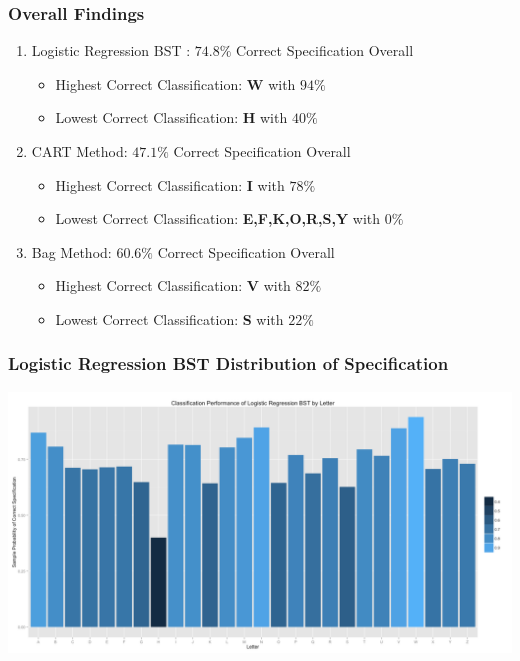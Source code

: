 \documentclass{beamer}
\begin{document}
\begin{frame}
\frametitle{Overall Findings}
\begin{enumerate}
\item Logistic Regression BST : $74.8\%$ Correct Specification Overall
\begin{itemize}
\item Highest Correct Classification: \textbf{W} with $94\%$
\item Lowest Correct Classification: \textbf{H} with $40\%$
\end{itemize}
\item CART Method: $47.1\%$ Correct Specification Overall
\begin{itemize}
\item Highest Correct Classification: \textbf{I} with $78\%$
\item Lowest Correct Classification: \textbf{E,F,K,O,R,S,Y} with $0\%$
\end{itemize}
\item Bag Method: $60.6\%$ Correct Specification Overall
\begin{itemize}
\item Highest Correct Classification: \textbf{V} with $82\%$
\item Lowest Correct Classification: \textbf{S} with $22\%$
\end{itemize}
\end{enumerate}
\end{frame}

\begin{frame}
\frametitle{Logistic Regression BST Distribution of Specification}
\begin{center} 
\includegraphics[width=1 \textwidth]{hkMiss}
\end{center}
\end{frame}
\end{document}
